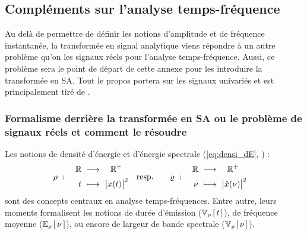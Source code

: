 
\subsection{Compléments sur l'analyse temps-fréquence} \label{ann:complement_t-f}

Au delà de permettre de définir les notions d'amplitude et de fréquence instantanée, la transformée en signal analytique viens répondre à un autre problème qu'on les signaux réels pour l'analyse temps-fréquence. 
Aussi, ce problème sera le point de départ de cette annexe pour les introduire la transformée en SA.
Tout le propos portera sur les signaux univariés et est principalement tiré de \cite{cohen_time_1995}.
\\



\subsubsection{Formalisme derrière la transformée en SA ou le problème de signaux réels et comment le résoudre} \label{sec:transfo_SA}

Les notions de densité d'énergie et d'énergie spectrale (\cref{eq:densi_dE}, ) :
\begin{align*}
	\densit\ &:\quad \begin{aligned}\R\ &\lr\quad \R^+ \\ t\ &\longmapsto\ \big|x(t)\big|^2 \end{aligned}  
	&
	\text{resp.}\qquad \densis\ &:\quad \begin{aligned}\R\ &\lr\quad \R^+ \\ \nu\ &\longmapsto\ \big|\fou{x}(\nu)\big|^2 \end{aligned}
\end{align*}
sont des concepts centraux en analyse temps-fréquences. Entre autre, leurs moments formalisent les notions de durée d'émission ($\var[\densit]{t}$), de fréquence moyenne ($\esp[\densis]{\nu}$), ou encore de largeur de bande spectrale ($\var[\densis]{\nu}$).
\\

